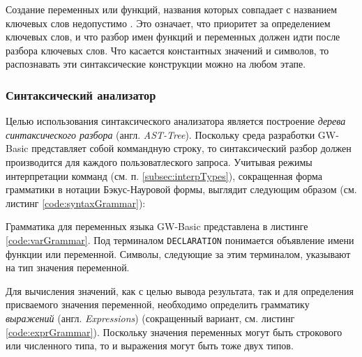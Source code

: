 \documentclass[12pt]{article}
\begin{document}
				\indent Создание переменных или функций, названия которых совпадает с названием ключевых слов недопустимо \cite{basicManual}. Это означает, что приоритет за определением ключевых слов, и что разбор имен функций и переменных должен идти после разбора ключевых слов. Что касается константных значений и символов, то распознавать эти синтаксические конструкции можно на любом этапе.
			\subsubsection{Синтаксический анализатор}
			\label{subsec:syntaxAnalyzer}
				\hspace{\parindent} Целью использования синтаксического анализатора является построение {\it дерева синтаксического разбора} (англ. {\it AST-Tree}). Поскольку среда разработки GW-Basic представляет собой коммандную строку, то синтаксический разбор должен производится для каждого пользоватлеского запроса. Учитывая режимы интерпретации комманд (см. п. \ref{subsec:interpTypes}), сокращенная форма грамматики в нотации Бэкус-Науровой формы, выглядит следующим образом (см. листинг \ref{code:syntaxGrammar}):
				
				
				\indent Грамматика для переменных языка GW-Basic представлена в листинге \ref{code:varGrammar}. Под терминалом {\tt DECLARATION} понимается объявление имени функции или переменной. Символы, следующие за этим терминалом, указывают на тип значения переменной.
				
				
				\indent Для вычисления значений, как с целью вывода результата, так и для определения присваемого значения переменной, необходимо определить грамматику {\it выражений} (англ. {\it Expressions}) (сокращенный вариант, см. листинг \ref{code:exprGrammar}). Поскольку значения переменных могут быть строкового или численного типа, то и выражения могут быть тоже двух типов. 
				
				
\end{document}
